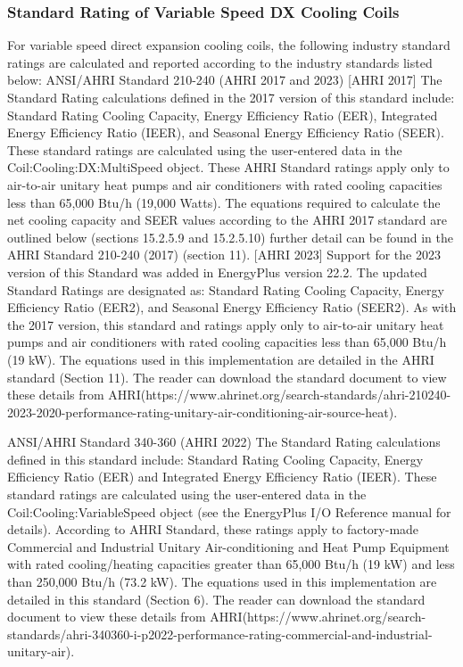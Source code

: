 \subsubsection{Standard Rating of Variable Speed DX Cooling Coils}\label{standard-rating-of-variable-speed-dx-cooling-coils}

For variable speed direct expansion cooling coils, the following industry standard ratings are calculated and reported according to the industry standards listed below:
ANSI/AHRI Standard 210-240 (AHRI 2017 and 2023)
[AHRI 2017] The Standard Rating calculations defined in the 2017 version of this standard include: Standard Rating Cooling Capacity, Energy Efficiency Ratio (EER), Integrated Energy Efficiency Ratio (IEER), and Seasonal Energy Efficiency Ratio (SEER). These standard ratings are calculated using the user-entered data in the Coil:Cooling:DX:MultiSpeed object. These AHRI Standard ratings apply only to air-to-air unitary heat pumps and air conditioners with rated cooling capacities less than 65,000 Btu/h (19,000 Watts). The equations required to calculate the net cooling capacity and SEER values according to the AHRI 2017 standard are outlined below (sections 15.2.5.9 and 15.2.5.10) further detail can be found in the AHRI Standard 210-240 (2017) (section 11).
[AHRI 2023] Support for the 2023 version of this Standard was added in EnergyPlus version 22.2. The updated Standard Ratings are designated as: Standard Rating Cooling Capacity, Energy Efficiency Ratio (EER2), and Seasonal Energy Efficiency Ratio (SEER2). As with the 2017 version, this standard and ratings apply only to air-to-air unitary heat pumps and air conditioners with rated cooling capacities less than 65,000 Btu/h (19 kW). The equations used in this implementation are detailed in the AHRI standard (Section 11). The reader can download the standard document to view these details from AHRI(https://www.ahrinet.org/search-standards/ahri-210240-2023-2020-performance-rating-unitary-air-conditioning-air-source-heat).

ANSI/AHRI Standard 340-360 (AHRI 2022)
The Standard Rating calculations defined in this standard include: Standard Rating Cooling Capacity, Energy Efficiency Ratio (EER) and Integrated Energy Efficiency Ratio (IEER). These standard ratings are calculated using the user-entered data in the Coil:Cooling:VariableSpeed object (see the EnergyPlus I/O Reference manual for details). According to AHRI Standard, these ratings apply to factory-made Commercial and Industrial Unitary Air-conditioning and Heat Pump Equipment with rated cooling/heating capacities greater than 65,000 Btu/h (19 kW) and less than 250,000 Btu/h (73.2 kW). The equations used in this implementation are detailed in this standard (Section 6). The reader can download the standard document to view these details from AHRI(https://www.ahrinet.org/search-standards/ahri-340360-i-p2022-performance-rating-commercial-and-industrial-unitary-air).

